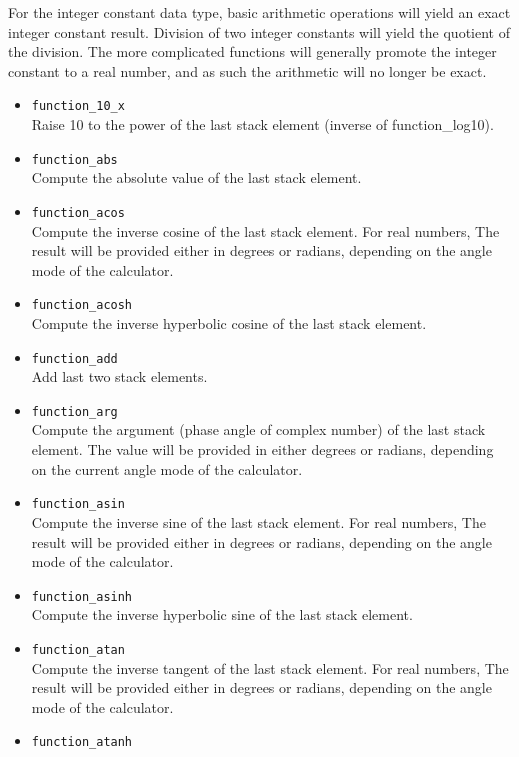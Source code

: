 \documentclass[11pt,notitlepage]{article}
\begin{document}
For the integer constant data type, basic arithmetic operations will yield an exact
integer constant result.  Division of two integer constants will yield the quotient of
the division.  The more complicated functions will generally promote the integer constant
to a real number, and as such the arithmetic will no longer be exact.
\begin{itemize}
   \item {\tt function\_10\_x} \\
      Raise 10 to the power of the last stack element (inverse of function\_log10).
   \item {\tt function\_abs} \\
      Compute the absolute value of the last stack element.
   \item {\tt function\_acos} \\
      Compute the inverse cosine of the last stack element.  For real numbers,
      The result will be provided either in degrees or radians, depending on
      the angle mode of the calculator.
   \item {\tt function\_acosh} \\
      Compute the inverse hyperbolic cosine of the last stack element.
   \item {\tt function\_add} \\
      Add last two stack elements.
   \item {\tt function\_arg} \\
      Compute the argument (phase angle of complex number) of the last stack
      element.  The value will be provided in either degrees or radians,
      depending on the current angle mode of the calculator.
   \item {\tt function\_asin} \\
      Compute the inverse sine of the last stack element.  For real numbers,
      The result will be provided either in degrees or radians, depending on
      the angle mode of the calculator.
   \item {\tt function\_asinh} \\
      Compute the inverse hyperbolic sine of the last stack element.
   \item {\tt function\_atan} \\
      Compute the inverse tangent of the last stack element.  For real numbers,
      The result will be provided either in degrees or radians, depending on
      the angle mode of the calculator.
   \item {\tt function\_atanh} \\

\end{itemize}
\end{document}
